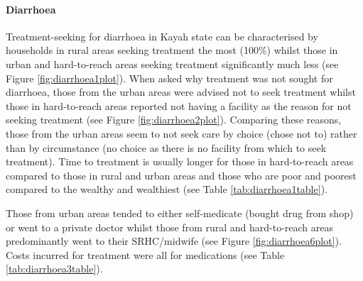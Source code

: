 \documentclass[12pt,a4paper]{article}
\let\oldparagraph\paragraph
\renewcommand{\paragraph}[1]{\oldparagraph{#1}\mbox{}}
\begin{document}
\hypertarget{diarrhoea}{%
\paragraph{Diarrhoea}\label{diarrhoea}}

Treatment-seeking for diarrhoea in Kayah state can be characterised by households in rural areas seeking treatment the most (100\%) whilst those in urban and hard-to-reach areas seeking treatment significantly much less (see Figure \ref{fig:diarrhoea1plot}). When asked why treatment was not sought for diarrhoea, those from the urban areas were advised not to seek treatment whilst those in hard-to-reach areas reported not having a facility as the reason for not seeking treatment (see Figure \ref{fig:diarrhoea2plot}). Comparing these reasons, those from the urban areas seem to not seek care by choice (chose not to) rather than by circumstance (no choice as there is no facility from which to seek treatment). Time to treatment is usually longer for those in hard-to-reach areas compared to those in rural and urban areas and those who are poor and poorest compared to the wealthy and wealthiest (see Table \ref{tab:diarrhoea1table}).

Those from urban areas tended to either self-medicate (bought drug from shop) or went to a private doctor whilst those from rural and hard-to-reach areas predominantly went to their SRHC/midwife (see Figure \ref{fig:diarrhoea6plot}). Costs incurred for treatment were all for medications (see Table \ref{tab:diarrhoea3table}).
\end{document}
